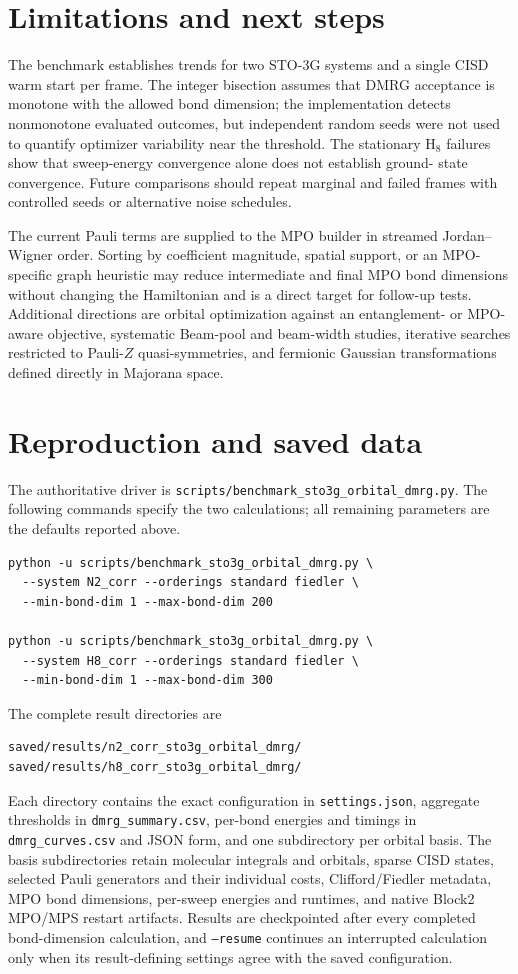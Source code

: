 \documentclass[a4paper,onecolumn,10pt]{article}
\begin{document}
\section{Limitations and next steps}

The benchmark establishes trends for two STO-3G systems and a single CISD
warm start per frame.  The integer bisection assumes that DMRG acceptance is
monotone with the allowed bond dimension; the implementation detects
nonmonotone evaluated outcomes, but independent random seeds were not used to
quantify optimizer variability near the threshold.  The stationary H$_8$
failures show that sweep-energy convergence alone does not establish ground-
state convergence.  Future comparisons should repeat marginal and failed
frames with controlled seeds or alternative noise schedules.

The current Pauli terms are supplied to the MPO builder in streamed
Jordan--Wigner order.  Sorting by coefficient magnitude, spatial support, or
an MPO-specific graph heuristic may reduce intermediate and final MPO bond
dimensions without changing the Hamiltonian and is a direct target for
follow-up tests.  Additional directions are orbital optimization against an
entanglement- or MPO-aware objective, systematic Beam-pool and beam-width
studies, iterative searches restricted to Pauli-$Z$ quasi-symmetries, and
fermionic Gaussian transformations defined directly in Majorana space.

\section{Reproduction and saved data}

The authoritative driver is
\texttt{scripts/benchmark\_sto3g\_orbital\_dmrg.py}.  The following commands
specify the two calculations; all remaining parameters are the defaults
reported above.

\begin{verbatim}
python -u scripts/benchmark_sto3g_orbital_dmrg.py \
  --system N2_corr --orderings standard fiedler \
  --min-bond-dim 1 --max-bond-dim 200

python -u scripts/benchmark_sto3g_orbital_dmrg.py \
  --system H8_corr --orderings standard fiedler \
  --min-bond-dim 1 --max-bond-dim 300
\end{verbatim}

The complete result directories are
\begin{verbatim}
saved/results/n2_corr_sto3g_orbital_dmrg/
saved/results/h8_corr_sto3g_orbital_dmrg/
\end{verbatim}
Each directory contains the exact configuration in \texttt{settings.json},
aggregate thresholds in \texttt{dmrg\_summary.csv}, per-bond energies and
timings in \texttt{dmrg\_curves.csv} and JSON form, and one subdirectory per
orbital basis.  The basis subdirectories retain molecular integrals and
orbitals, sparse CISD states, selected Pauli generators and their individual
costs, Clifford/Fiedler metadata, MPO bond dimensions, per-sweep energies and
runtimes, and native Block2 MPO/MPS restart artifacts.  Results are
checkpointed after every completed bond-dimension calculation, and
\texttt{--resume} continues an interrupted calculation only when its
result-defining settings agree with the saved configuration.
\end{document}
